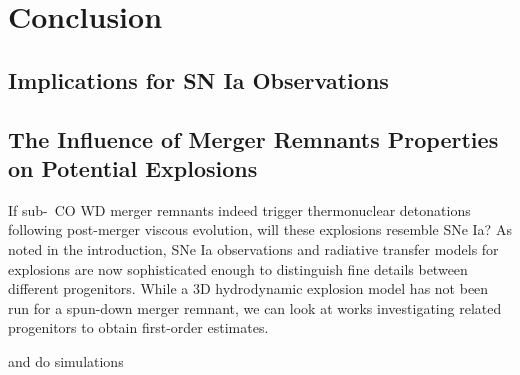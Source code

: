 \chapter{Conclusion}

\section{Implications for SN Ia Observations}

\section{The Influence of Merger Remnants Properties on Potential Explosions}

If sub-\Mch\ CO WD merger remnants indeed trigger thermonuclear detonations following post-merger viscous evolution, will these explosions resemble SNe Ia?  As noted in the introduction, SNe Ia observations and radiative transfer models for explosions are now sophisticated enough to distinguish fine details between different progenitors.  While a 3D hydrodynamic explosion model has not been run for a spun-down merger remnant, we can look at works investigating related progenitors to obtain first-order estimates.

\cite{frye+10} and \cite{rask+14} do simulations
